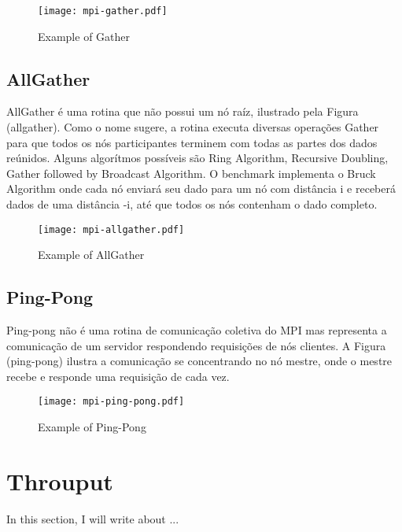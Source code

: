 			\begin{figure}[!tb]
				\centering%
				\caption{Example of \mpi Gather}%
				\label{fig:exp-gather}%
				\texttt{[image: mpi-gather.pdf]}%
			\end{figure}

		\subsection{AllGather}

			AllGather é uma rotina que não possui um nó raíz, ilustrado pela Figura (allgather).
			Como o nome sugere, a rotina executa diversas operações Gather para que todos os nós participantes terminem com todas as partes dos dados reúnidos.
			Alguns algorítmos possíveis são Ring Algorithm, Recursive Doubling, Gather followed by Broadcast Algorithm.
			O benchmark implementa o Bruck Algorithm onde cada nó enviará seu dado para um nó com distância i e receberá dados de uma distância -i, até que todos os nós contenham o dado completo.

			\begin{figure}[!tb]
				\centering%
				\caption{Example of \mpi AllGather}%
				\label{fig:exp-allgather}%
				\texttt{[image: mpi-allgather.pdf]}%
			\end{figure}

		\subsection{Ping-Pong}

			Ping-pong não é uma rotina de comunicação coletiva do MPI mas representa a comunicação de um servidor respondendo requisições de nós clientes.
			A Figura (ping-pong) ilustra a comunicação se concentrando no nó mestre, onde o mestre recebe e responde uma requisição de cada vez.

			\begin{figure}[!tb]
			    \centering%
			    \caption{Example of Ping-Pong}%
			    \label{fig:exp-ping-pong}%
			    \texttt{[image: mpi-ping-pong.pdf]}%
			\end{figure}

	\section{Throuput}

		In this section, I will write about ...